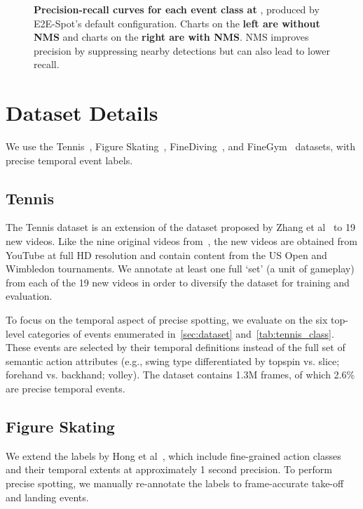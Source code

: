 \documentclass[runningheads]{llncs}
\newcommand{\OURMETHOD}{{E2E-Spot}\xspace}
\newcommand{\finegym}{{FineGym}\xspace}
\newcommand{\finediving}{{FineDiving}\xspace}
\begin{document}
\begin{figure*}[p]
    \caption{
        {\bf Precision-recall curves for each event class at }, produced by \OURMETHOD's default configuration. Charts on the {\bf left are without NMS} and charts on the {\bf right are with NMS}.
        NMS improves precision by suppressing nearby detections but can also lead to lower recall.
    }
    \label{fig:supp_pr_curves}
\end{figure*}  
\section{Dataset Details}
\label{sec:supp_dataset}

We use the Tennis~\cite{vid2player}, Figure Skating~\cite{vpd}, \finediving~\cite{finediving}, and \finegym~\cite{finegym} datasets, with precise temporal event labels.

\subsection{Tennis}

The Tennis dataset is an extension of the dataset proposed by Zhang et al~\cite{vid2player} to 19 new videos.
Like the nine original videos from~\cite{vid2player}, the new videos are obtained from YouTube at full HD resolution and contain content from the US Open and Wimbledon tournaments.
We annotate at least one full `set' (a unit of gameplay) from each of the 19 new videos in order to diversify the dataset for training and evaluation.

To focus on the temporal aspect of precise spotting, we evaluate on the six top-level categories of events enumerated in~\autoref{sec:dataset} and~\autoref{tab:tennis_class}.
These events are selected by their temporal definitions instead of the full set of semantic action attributes (e.g., swing type differentiated by topspin vs. slice; forehand vs. backhand; volley).
The dataset contains 1.3M frames, of which 2.6\% are precise temporal events.

\subsection{Figure Skating}
\label{sub:supp_fs_dataset}

We extend the labels by Hong et al~\cite{vpd}, which include fine-grained action classes and their temporal extents at approximately 1 second precision.
To perform precise spotting, we manually re-annotate the labels to frame-accurate take-off and landing events.
\end{document}
